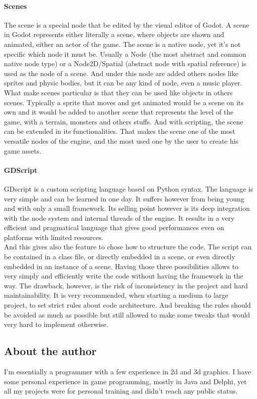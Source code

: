 \documentclass[10pt,a4paper]{article}
\begin{document}
\paragraph{Scenes}
The scene is a special node that be edited by the visual editor of Godot. A scene in Godot represents either literally a scene, where objects are shown and animated, either an actor of the game. The scene is a native node, yet it's not specific which node it must be. Usually a Node (the most abstract and common native node type) or a Node2D/Spatial (abstract node with spatial reference) is used as the node of a scene. And under this node are added others nodes like sprites and physic bodies, but it can be any kind of node, even a music player.
What make scenes particular is that they can be used like objects in others scenes. Typically a sprite that moves and get animated would be a scene on its own and it would be added to another scene that represents the level of the game, with a terrain, monsters and others stuffs. And with scripting, the scene can be extended in its functionalities. That makes the scene one of the most versatile nodes of the engine, and the most used one by the user to create his game assets.
\paragraph{GDScript}
GDscript is a custom scripting language based on Python syntax. The language is very simple and can be learned in one day. It suffers however from being young and with only a small framework. Its selling point however is its deep integration with the node system and internal threads of the engine. It results in a very efficient and pragmatical language that gives good performances even on platforms with limited resources.\\
And this gives also the feature to chose how to structure the code. The script can be contained in a class file, or directly embedded in a scene, or even directly embedded in an instance of a scene. Having those three possibilities allows to very simply and efficiently write the code without having the framework in the way. The drawback, however, is the risk of inconsistency in the project and hard maintainability. It is very recommended, when starting a medium to large project, to set strict rules about code architecture. And breaking the rules should be avoided as much as possible but still allowed to make some tweaks that would very hard to implement otherwise.

\subsection{About the author}
I'm essentially a programmer with a few experience in 2d and 3d graphics. I have some personal experience in game programming, mostly in Java and Delphi, yet all my projects were for personal training and didn't reach any public status.
\end{document}
